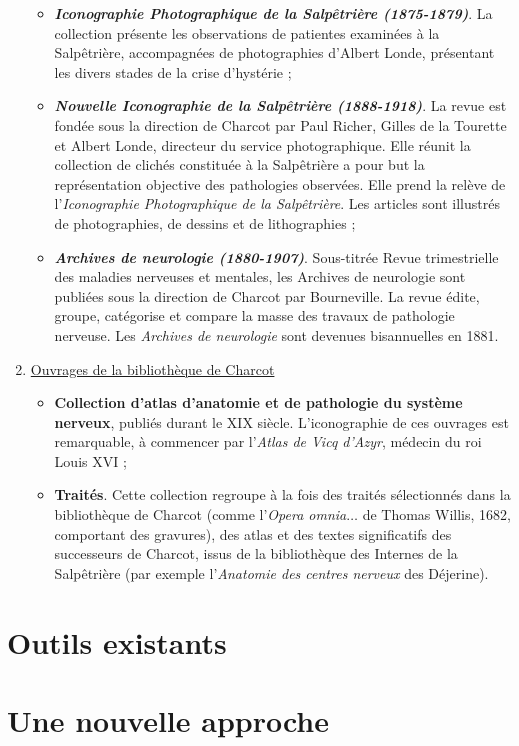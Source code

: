 \begin{enumerate}
\begin{itemize}
\item \textbf{\textit{Iconographie Photographique de la Salpêtrière (1875-1879)}}. La collection présente les observations de patientes examinées à la Salpêtrière, accompagnées de photographies d'Albert Londe, présentant les divers stades de la crise d'hystérie ;
\item \textbf{\textit{Nouvelle Iconographie de la Salpêtrière (1888-1918)}}. La revue est fondée sous la direction de Charcot par Paul Richer, Gilles de la Tourette et Albert Londe, directeur du service photographique. Elle réunit la collection de clichés constituée à la Salpêtrière a pour but la représentation objective des pathologies observées. Elle prend la relève de l'\textit{Iconographie Photographique de la Salpêtrière}. Les articles sont illustrés de photographies, de dessins et de lithographies ;
\item \textbf{\textit{Archives de neurologie (1880-1907)}}. Sous-titrée \og{}Revue trimestrielle des maladies nerveuses et mentales\fg{}, les Archives de neurologie sont publiées sous la direction de Charcot par Bourneville. La revue édite, groupe, catégorise et compare la masse des travaux de pathologie nerveuse. Les \textit{Archives de neurologie} sont devenues bisannuelles en 1881.
\end{itemize}
\item \underline{Ouvrages de la bibliothèque de Charcot}
\begin{itemize}
\item \textbf{Collection d'atlas d'anatomie et de pathologie du système nerveux}, publiés durant le XIX\ieme{} siècle. L'iconographie de ces ouvrages est remarquable, à commencer par l'\textit{Atlas de Vicq d'Azyr}, médecin du roi Louis XVI ;
\item \textbf{Traités}. Cette collection regroupe à la fois des traités sélectionnés dans la bibliothèque de Charcot (comme l'\textit{Opera omnia}$\dots$ de Thomas Willis, 1682, comportant des gravures), des atlas et des textes significatifs des successeurs de Charcot, issus de la bibliothèque des Internes de la Salpêtrière (par exemple l'\textit{Anatomie des centres nerveux} des Déjerine).
\end{itemize}
\end{enumerate}
\section{Outils existants}
\section{Une nouvelle approche}

